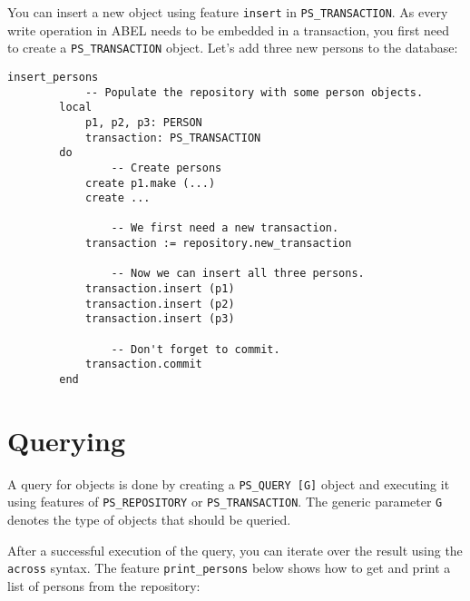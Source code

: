 \documentclass[a4paper,12pt]{report}
\begin{document}
You can insert a new object using feature \lstinline{insert} in \lstinline{PS_TRANSACTION}.
As every write operation in ABEL needs to be embedded in a transaction, you first need to create a \lstinline{PS_TRANSACTION} object.
Let's add three new persons to the database:
\begin{lstlisting}[language=OOSC2Eiffel, captionpos=b, caption={Insertion code.}, label={lst:tutorial_insert}]
	insert_persons
			-- Populate the repository with some person objects.
		local
			p1, p2, p3: PERSON
			transaction: PS_TRANSACTION
		do
				-- Create persons
			create p1.make (...)
			create ...

				-- We first need a new transaction.
			transaction := repository.new_transaction

				-- Now we can insert all three persons.
			transaction.insert (p1)
			transaction.insert (p2)
			transaction.insert (p3)

				-- Don't forget to commit.
			transaction.commit
		end
\end{lstlisting}

\section{Querying}
\label{section:querying}
A query for objects is done by creating a \lstinline!PS_QUERY [G]! object and executing it using features of \lstinline!PS_REPOSITORY! or \lstinline!PS_TRANSACTION!.
The generic parameter \lstinline!G! denotes the type of objects that should be queried.

After a successful execution of the query, you can iterate over the result using the \lstinline!across! syntax. 
The feature \lstinline{print_persons} below shows how to get and print a list of persons from the repository:
\end{document}
